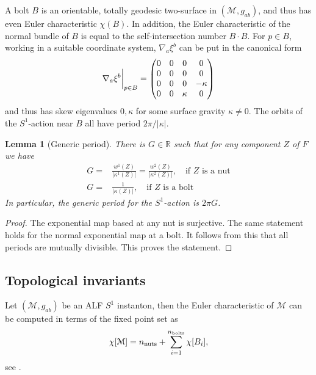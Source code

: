 \documentclass[a4paper,10pt,reqno]{amsart}
\newcommand{\Reals}{\mathbb{R}}
\newcommand{\bolt}{B}
\newcommand{\cM}{\mathcal{M}}
\theoremstyle{plain}
\newtheorem{lemma}[thm]{Lemma}
\newcommand{\nnuts}{n_{\text{\rm nuts}}}
\newcommand{\nbolts}{n_{\text{\rm bolts}}}
\newcommand{\Fixed}{F}
\numberwithin{equation}{section}
\begin{document}
A bolt $\bolt$ is an orientable, totally geodesic two-surface in $(\cM, g_{ab})$, and thus has even Euler characteristic $\chi(\bolt)$. In addition, the Euler characteristic of the normal bundle of $\bolt$ is equal to the self-intersection number $\bolt\!\cdot\!\bolt$. For $p \in \bolt$, working in a suitable coordinate system, $\nabla_a \xi^b$ can be put in the canonical form 
\begin{align} \label{eq:nablaxi(bolt)}
\nabla_a \xi^b \bigg{|}_{p \in \bolt} 
= 
\begin{pmatrix}
0&0&0&0 \\
0 &0&0&0 \\
0&0&0&-\kappa \\
0&0&\kappa&0
\end{pmatrix}
\end{align} 
and thus has skew eigenvalues $0, \kappa$ for some surface gravity $\kappa \ne 0$. The orbits of the $S^1$-action near $\bolt$ all have period $2\pi/|\kappa|$. 

\begin{lemma}[Generic period] \label{lem:generic}
There is $G \in \Reals$ such that for any component $Z$ of $\Fixed$ we have    
\begin{align} 
G ={}& \frac{w^1(Z)}{|\kappa^1(Z)|} = \frac{w^2(Z)}{|\kappa^2(Z)|}, \quad \text{if $Z$ is a nut} \\
G ={}& \frac{1}{|\kappa(Z)|}, \quad \text{if $Z$ is a bolt}
\end{align} 
In particular, the generic period for the $S^1$-action is $2\pi G$. 
\end{lemma} 
\begin{proof} 
The exponential map based at any nut is surjective. The same statement holds for the normal exponential map at a bolt. It follows from this that all periods are mutually divisible. This proves the statement. 
\end{proof} 

 
\subsection{Topological invariants} \label{sec:topin}

Let $(\cM, g_{ab})$ be an ALF $S^1$ instanton, then the Euler characteristic of $\cM$ can be computed in terms of the fixed point set as
\begin{align} \label{eq:chinutbolt}
\chi[\cM] = \nnuts + \sum_{i=1}^{\nbolts} \chi[\bolt_i], 
\end{align} 
see \cite{HirzebruchBergerJung}.
\end{document}
